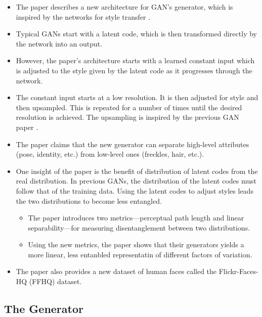 \documentclass[10pt]{article}
\begin{document}
  \begin{itemize}
  	\item The paper describes a new architecture for GAN's generator, which is inspired by the networks for style transfer \cite{Huang:2017}.

  	\item Typical GANs start with a latent code, which is then transformed directly by the network into an output.

  	\item However, the paper's architecture starts with a learned constant input which is adjusted to the style given by the latent code as it progresses through the network.

  	\item The constant input starts at a low resolution. It is then adjusted for style and then upsampled. This is repeated for a number of times until the desired resolution is achieved. The upsampling is inspired by the previous GAN paper \cite{Karras:2017}.

  	\item The paper claims that the new generator can separate high-level attributes (pose, identity, etc.) from low-level ones (freckles, hair, etc.).

  	\item One insight of the paper is the benefit of distribution of latent codes from the real distribution. In previous GANs, the distribution of the latent codes must follow that of the training data. Using the latent codes to adjust styles leads the two distributions to become less entangled.

  	\begin{itemize}
  		\item The paper introduces two metrics---perceptual path length and linear separability---for measuring disentanglement between two distributions.

  		\item Using the new metrics, the paper shows that their generators yields a more linear, less entanbled representatin of different factors of variation.
  	\end{itemize}

  	\item The paper also provides a new dataset of human faces called the Flickr-Faces-HQ (FFHQ) dataset.
  \end{itemize}

  \subsection{The Generator}
\end{document}
